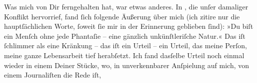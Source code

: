 \pstart
           Was mich von Dir ferngehalten hat, war etwas anderes. In \label{K_L03478-6v}\label{K_L03478-6}, die unſer
               damaliger Konflikt {\pb}hervorrief, fand ſich
               folgende Äußerung über mich (ich zitire nur die hauptſächlichen Worte, ſoweit ſie mir
               in der Erinnerung geblieben ſind): »Du biſt ein Menſch ohne jede Phantaſie – eine
               gänzlich unkünſtleriſche Natur.« Das iſt ſchlimmer als eine Kränkung – das iſt ein
               Urteil – ein Urteil, das meine Perſon, meine ganze Lebensarbeit tief herabſetzt. Ich
               fand dasſelbe Urteil noch einmal wieder in einem Deiner Stücke, wo, in unverkennbarer Anſpielung auf
               mich, {\pb}von einem Journaliſten die Rede iſt,
